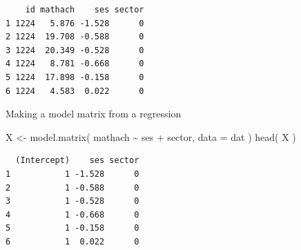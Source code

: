 \documentclass[
  letterpaper,
  DIV=11,
  numbers=noendperiod]{scrreprt}
\newenvironment{Shaded}{\begin{snugshade}}{\end{snugshade}}
\newcommand{\AttributeTok}[1]{\textcolor[rgb]{0.49,0.56,0.16}{#1}}
\newcommand{\ConstantTok}[1]{\textcolor[rgb]{0.53,0.00,0.00}{#1}}
\newcommand{\DocumentationTok}[1]{\textcolor[rgb]{0.73,0.13,0.13}{\textit{#1}}}
\newcommand{\FunctionTok}[1]{\textcolor[rgb]{0.02,0.16,0.49}{#1}}
\newcommand{\NormalTok}[1]{\textcolor[rgb]{0.00,0.44,0.13}{#1}}
\newcommand{\OtherTok}[1]{\textcolor[rgb]{0.00,0.44,0.13}{#1}}
\newcommand{\SpecialCharTok}[1]{\textcolor[rgb]{0.25,0.44,0.63}{#1}}
\newcommand{\StringTok}[1]{\textcolor[rgb]{0.25,0.44,0.63}{#1}}
\begin{document}
\begin{Shaded}
\end{Shaded}

\begin{verbatim}
    id mathach    ses sector
1 1224   5.876 -1.528      0
2 1224  19.708 -0.588      0
3 1224  20.349 -0.528      0
4 1224   8.781 -0.668      0
5 1224  17.898 -0.158      0
6 1224   4.583  0.022      0
\end{verbatim}

Making a model matrix from a regression

\begin{Shaded}
\begin{Highlighting}[]
\NormalTok{X }\OtherTok{\textless{}{-}} \FunctionTok{model.matrix}\NormalTok{( mathach }\SpecialCharTok{\textasciitilde{}}\NormalTok{ ses }\SpecialCharTok{+}\NormalTok{ sector, }\AttributeTok{data =}\NormalTok{ dat )}
\FunctionTok{head}\NormalTok{( X )}
\end{Highlighting}
\end{Shaded}

\begin{verbatim}
  (Intercept)    ses sector
1           1 -1.528      0
2           1 -0.588      0
3           1 -0.528      0
4           1 -0.668      0
5           1 -0.158      0
6           1  0.022      0
\end{verbatim}

\begin{Shaded}
\end{Shaded}
\end{document}
